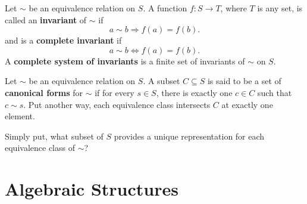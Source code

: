 \begin{definition}
Let $\sim$ be an equivalence relation on $S$. A function $f\colon S\rightarrow T$, where $T$ is any set, is called an \textbf{invariant} of $\sim$ if
\[a\sim b\Rightarrow f(a)=f(b).\]
and is a \textbf{complete invariant} if 
\[a\sim b\Leftrightarrow f(a)=f(b).\]
A \textbf{complete system of invariants} is a finite set of invariants of $\sim$ on $S$.
\end{definition}

\begin{definition}
Let $\sim$ be an equivalence relation on $S$. A subset $C\subseteq S$ is said to be a set of \textbf{canonical forms} for $\sim$ if for every $s\in S$, there is exactly one $c\in C$ such that $c\sim s$. Put another way, each equivalence class intersects $C$ at exactly one element.
\end{definition}
Simply put, what subset of $S$ provides a unique representation for each equivalence class of $\sim$?

\begin{definition}

\end{definition}

\begin{definition}

\end{definition}

\begin{definition}

\end{definition}

\begin{definition}

\end{definition}

\begin{definition}

\end{definition}

\section{Algebraic Structures}